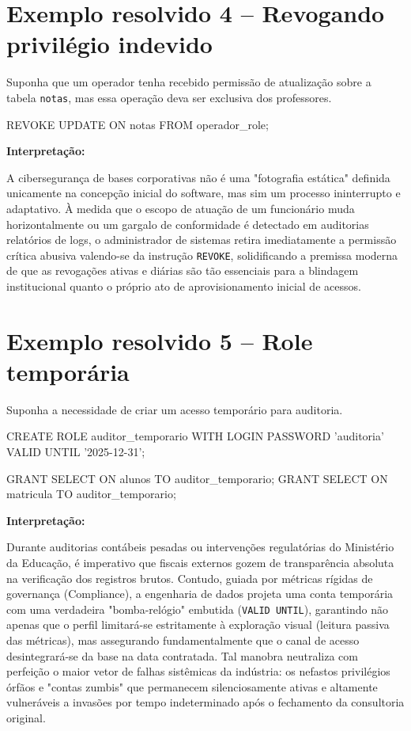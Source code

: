 \section{Exemplo resolvido 4 -- Revogando privilégio indevido}

Suponha que um operador tenha recebido permissão de atualização sobre a tabela \texttt{notas}, mas essa operação deva ser exclusiva dos professores.

\begin{sqlcode}
REVOKE UPDATE ON notas FROM operador_role;
\end{sqlcode}

\textbf{Interpretação:}

A cibersegurança de bases corporativas não é uma "fotografia estática" definida unicamente na concepção inicial do software, mas sim um processo ininterrupto e adaptativo. À medida que o escopo de atuação de um funcionário muda horizontalmente ou um gargalo de conformidade é detectado em auditorias relatórios de logs, o administrador de sistemas retira imediatamente a permissão crítica abusiva valendo-se da instrução \texttt{REVOKE}, solidificando a premissa moderna de que as revogações ativas e diárias são tão essenciais para a blindagem institucional quanto o próprio ato de aprovisionamento inicial de acessos.

\section{Exemplo resolvido 5 -- Role temporária}

Suponha a necessidade de criar um acesso temporário para auditoria.

\begin{sqlcode}
CREATE ROLE auditor_temporario
WITH LOGIN
PASSWORD 'auditoria'
VALID UNTIL '2025-12-31';
\end{sqlcode}

\begin{sqlcode}
GRANT SELECT ON alunos TO auditor_temporario;
GRANT SELECT ON matricula TO auditor_temporario;
\end{sqlcode}

\textbf{Interpretação:}

Durante auditorias contábeis pesadas ou intervenções regulatórias do Ministério da Educação, é imperativo que fiscais externos gozem de transparência absoluta na verificação dos registros brutos. Contudo, guiada por métricas rígidas de governança (Compliance), a engenharia de dados projeta uma conta temporária com uma verdadeira "bomba-relógio" embutida (\texttt{VALID UNTIL}), garantindo não apenas que o perfil limitará-se estritamente à exploração visual (leitura passiva das métricas), mas assegurando fundamentalmente que o canal de acesso desintegrará-se da base na data contratada. Tal manobra neutraliza com perfeição o maior vetor de falhas sistêmicas da indústria: os nefastos privilégios órfãos e "contas zumbis" que permanecem silenciosamente ativas e altamente vulneráveis a invasões por tempo indeterminado após o fechamento da consultoria original.

